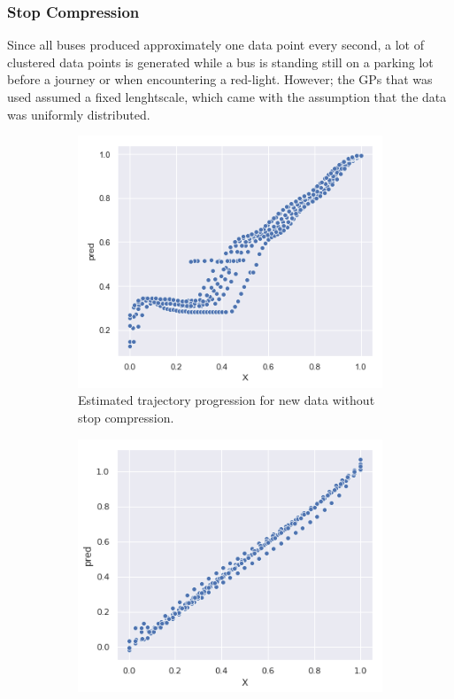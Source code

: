 \subsubsection{Stop Compression}
Since all buses produced approximately one data point every second, a lot of clustered data points is generated while a bus is standing still on a parking lot before a journey or when encountering a red-light. However; the GPs that was used assumed a fixed lenghtscale, which came with the assumption that the data was uniformly distributed.
\begin{figure}[H]
	\caption{Stop compression comparison}
  \begin{subfigure}[b]{0.5\textwidth}
    \includegraphics[width=\textwidth]{figures/traj-without-stop-compression.png}
    \caption{Estimated trajectory progression for new data without stop compression.}
    \label{fig:progression-without-stop-compression}
  \end{subfigure}
  \begin{subfigure}[b]{0.5\textwidth}
    \includegraphics[width=\textwidth]{figures/traj-with-stop-compression.png}

\end{subfigure}
\end{figure}
